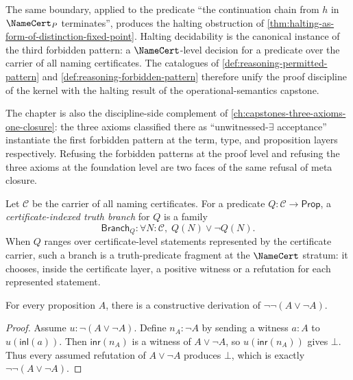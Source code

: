 \begin{remark}
\label{rem:reasoning-halting-sibling}
The same boundary, applied to the predicate ``the continuation chain from $h$ in $\NameCert_P$ terminates'', produces the halting obstruction of \autoref{thm:halting-as-form-of-distinction-fixed-point}. Halting decidability is the canonical instance of the third forbidden pattern: a $\NameCert$-level decision for a predicate over the carrier of all naming certificates. The catalogues of \autoref{def:reasoning-permitted-pattern} and \autoref{def:reasoning-forbidden-pattern} therefore unify the proof discipline of the kernel with the halting result of the operational-semantics capstone.
\end{remark}

\begin{remark}
\label{rem:reasoning-three-axioms-sibling}
The chapter is also the discipline-side complement of \autoref{ch:capstones-three-axioms-one-closure}: the three axioms classified there as ``unwitnessed-$\exists$ acceptance'' instantiate the first forbidden pattern at the term, type, and proposition layers respectively. Refusing the forbidden patterns at the proof level and refusing the three axioms at the foundation level are two faces of the same refusal of meta closure.
\end{remark}

\begin{definition}
\label{def:reasoning-certificate-indexed-truth-branch}
Let $\mathcal C$ be the carrier of all naming certificates. For a predicate $Q:\mathcal C\to\mathsf{Prop}$, a \emph{certificate-indexed truth branch} for $Q$ is a family
$$
\mathsf{Branch}_Q:\forall N:\mathcal C,\; Q(N)\vee\neg Q(N).
$$
When $Q$ ranges over certificate-level statements represented by the certificate carrier, such a branch is a truth-predicate fragment at the $\NameCert$ stratum: it chooses, inside the certificate layer, a positive witness or a refutation for each represented statement.
\end{definition}

\begin{lemma}
\label{lem:reasoning-excluded-middle-branch-double-negated}
For every proposition $A$, there is a constructive derivation of $\neg\neg(A\vee\neg A)$.
\end{lemma}

\begin{proof}
Assume $u:\neg(A\vee\neg A)$. Define $n_A:\neg A$ by sending a witness $a:A$ to $u(\mathsf{inl}(a))$. Then $\mathsf{inr}(n_A)$ is a witness of $A\vee\neg A$, so $u(\mathsf{inr}(n_A))$ gives $\bot$. Thus every assumed refutation of $A\vee\neg A$ produces $\bot$, which is exactly $\neg\neg(A\vee\neg A)$.
\end{proof}

